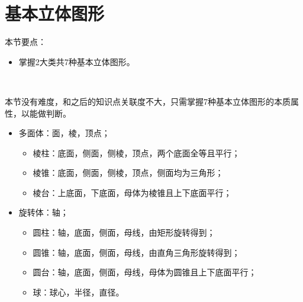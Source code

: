 \section{基本立体图形}

本节要点：
\begin{itemize}
    \item 掌握2大类共7种基本立体图形。
\end{itemize}

~

本节没有难度，和之后的知识点关联度不大，只需掌握7种基本立体图形的本质属性，以能做判断。

\begin{itemize}
    \item 多面体：面，棱，顶点；
    \begin{itemize}
        \item 棱柱：底面，侧面，侧棱，顶点，两个底面全等且平行；
        \item 棱锥：底面，侧面，侧棱，顶点，侧面均为三角形；
        \item 棱台：上底面，下底面，母体为棱锥且上下底面平行；
    \end{itemize}
    \item 旋转体：轴；
    \begin{itemize}
        \item 圆柱：轴，底面，侧面，母线，由矩形旋转得到；
        \item 圆锥：轴，底面，侧面，母线，由直角三角形旋转得到；
        \item 圆台：轴，底面，侧面，母线，母体为圆锥且上下底面平行；
        \item 球：球心，半径，直径。
    \end{itemize}
\end{itemize}




